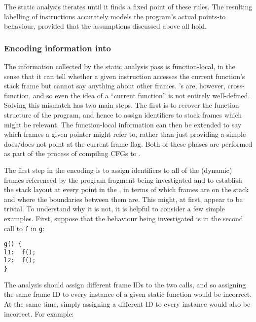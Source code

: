 The static analysis iterates until it finds a fixed point of these
rules.  The resulting labelling of instructions accurately models the
program's actual points-to behaviour, provided that the assumptions
discussed above all hold.


\subsubsection{Encoding information into \StateMachines}

The information collected by the static analysis pass is
function-local, in the sense that it can tell whether a given
instruction accesses the current function's stack frame but cannot say
anything about other frames.  {\Technique}'s {\StateMachines} are,
however, cross-function, and so even the idea of a ``current
function'' is not entirely well-defined.  Solving this mismatch has
two main steps.  The first is to recover the function structure of the
program, and hence to assign identifiers to stack frames which might
be relevant.  The function-local information can then be extended to
say which frames a given pointer might refer to, rather than just
providing a simple does/does-not point at the current frame flag.
Both of these phases are performed as part of the process of compiling
CFGs to {\StateMachines}.


The first step in the encoding is to assign identifiers to all of the
(dynamic) frames referenced by the program fragment being investigated
and to establish the stack layout at every point in the
{\StateMachine}, in terms of which frames are on the stack and where
the boundaries between them are.  This might, at first, appear to be
trivial.  To understand why it is not, it is helpful to consider a few
simple examples.  First, suppose that the behaviour being investigated
is in the second call to \verb|f| in \verb|g|:

\begin{verbatim}
g() {
l1:  f();
l2:  f();
}
\end{verbatim}

The analysis should assign different frame IDs to the two calls, and
so assigning the same frame ID to every instance of a given static
function would be incorrect.  At the same time, simply assigning a
different ID to every instance would also be incorrect.  For example:

